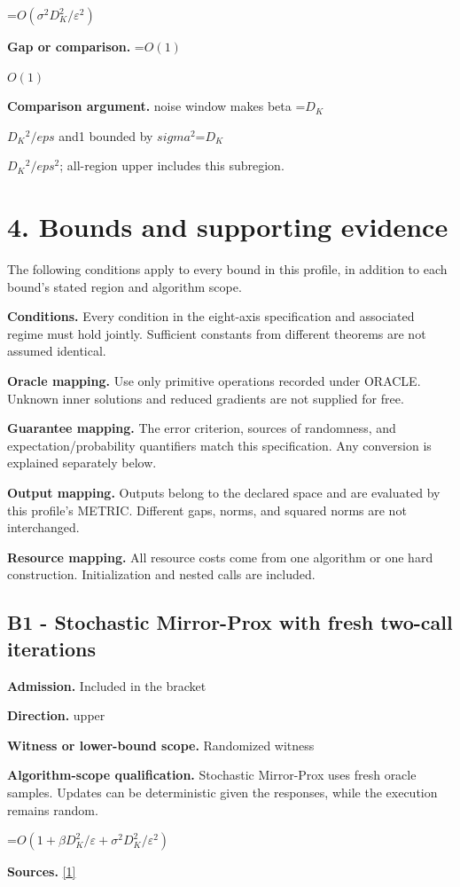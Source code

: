 \documentclass[10pt,a4paper]{article}
\newcommand{\AtlasMath}[1]{\par\begingroup\centering\setbox0=\hbox{$\displaystyle #1$}\ifdim\wd0>1.4\linewidth\typeout{ATLAS WIDE FORMULA: \the\wd0}\fi\ifdim\wd0>\linewidth\resizebox{\linewidth}{!}{\box0}\else\box0\fi\par\endgroup}
\newcommand{\AtlasInlineMath}[1]{\begingroup\setbox0=\hbox{$#1$}\ifdim\wd0>.4\linewidth\endgroup\AtlasMath{#1}\else\endgroup$#1$\fi}
\begin{document}
\AtlasMath{O(\sigma^2D_K^2/\varepsilon^2)}
\textbf{Gap or comparison.} \AtlasInlineMath{O(1)}

\textbf{Comparison argument.} noise window makes beta \AtlasInlineMath{D_K}$^2/eps$ and1 bounded by $sigma^2$\AtlasInlineMath{D_K}$^2/eps^2$; all-region upper includes this subregion.

\section{4. Bounds and supporting evidence}
The following conditions apply to every bound in this profile, in addition to each bound's stated region and algorithm scope.

\textbf{Conditions.} Every condition in the eight-axis specification and associated regime must hold jointly. Sufficient constants from different theorems are not assumed identical.

\textbf{Oracle mapping.} Use only primitive operations recorded under ORACLE. Unknown inner solutions and reduced gradients are not supplied for free.

\textbf{Guarantee mapping.} The error criterion, sources of randomness, and expectation/probability quantifiers match this specification. Any conversion is explained separately below.

\textbf{Output mapping.} Outputs belong to the declared space and are evaluated by this profile's METRIC. Different gaps, norms, and squared norms are not interchanged.

\textbf{Resource mapping.} All resource costs come from one algorithm or one hard construction. Initialization and nested calls are included.

\subsection{B1 - Stochastic Mirror-Prox with fresh two-call iterations}
\textbf{Admission.} Included in the bracket

\textbf{Direction.} upper

\textbf{Witness or lower-bound scope.} Randomized witness

\textbf{Algorithm-scope qualification.} Stochastic Mirror-Prox uses fresh oracle samples. Updates can be deterministic given the responses, while the execution remains random.

\AtlasMath{O(1+\beta D_K^2/\varepsilon+\sigma^2D_K^2/\varepsilon^2)}
\textbf{Sources.} \href{https://www.isye.gatech.edu/~nemirovs/SMP.pdf}{[1]}
\end{document}
